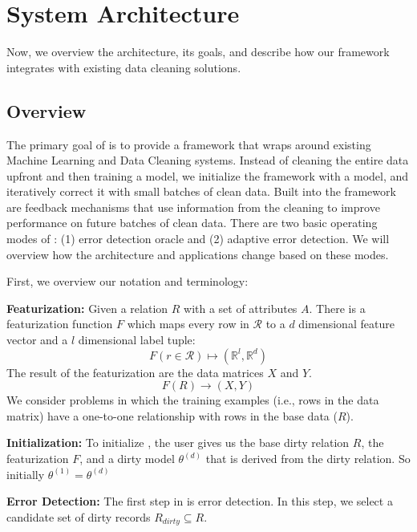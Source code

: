 \section{System Architecture}\label{arch}
Now, we overview the \sys architecture, its goals, and describe how our framework integrates with existing data cleaning solutions.

\subsection{Overview}
The primary goal of \sys is to provide a framework that wraps around existing Machine Learning and Data Cleaning systems.
Instead of cleaning the entire data upfront and then training a model, we initialize the framework with a model, and iteratively correct it with small batches of clean data.
Built into the framework are feedback mechanisms that use information from the cleaning to improve performance on future batches of clean data.
There are two basic operating modes of \sys: (1) error detection oracle and (2) adaptive error detection. 
We will overview how the architecture and applications change based on these modes.

First, we overview our notation and terminology:

\vspace{0.5em}

\noindent \textbf{Featurization: } Given a relation $R$ with a set of attributes $A$.
There is a featurization function $F$ which maps every row in $\mathcal{R}$ to a $d$ dimensional feature vector and a $l$ dimensional label tuple: 
\[F(r \in \mathcal{R}) \mapsto (\mathbb{R}^l, \mathbb{R}^d)\]
The result of the featurization are the data matrices $X$ and $Y$.
\[
F(R)\rightarrow (X,Y)
\]
We consider problems in which the training examples (i.e., rows in the data matrix) have a one-to-one relationship with rows in the base data ($R$).

\vspace{0.5em}

\noindent\textbf{Initialization: } To initialize \sys, the user gives us the base dirty relation $R$, the featurization $F$, and a dirty model $\theta^{(d)}$ that is derived from the dirty relation. So initially $\theta^{(1)} = \theta^{(d)}$

\vspace{0.5em}

\noindent\textbf{Error Detection: } The first step in \sys is error detection. In this step, we select a candidate set of dirty records $R_{dirty} \subseteq R$.  

